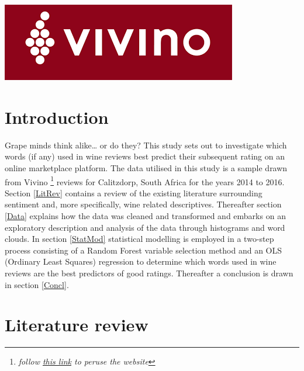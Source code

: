 \documentclass[11pt,preprint]{elsarticle}
\numberwithin{equation}{section}
\numberwithin{figure}{section}
\numberwithin{table}{section}
\let\rmarkdownfootnote\footnote%
\def\footnote{\protect\rmarkdownfootnote}
\begin{document}

\headsep 35pt %




\newpage

\begin{center}\includegraphics[width=0.8\linewidth]{writeup/vivino} \end{center}

\section{Introduction}\label{introduction}

\label{Intro}

Grape minds think alike\ldots{} or do they? This study sets out to
investigate which words (if any) used in wine reviews best predict their
subsequent rating on an online marketplace platform. The data utilised
in this study is a sample drawn from Vivino \footnote{\emph{follow
  \href{https://www.vivino.com/}{this link} to peruse the website}}
reviews for Calitzdorp, South Africa for the years 2014 to 2016. Section
\ref{LitRev} contains a review of the existing literature surrounding
sentiment and, more specifically, wine related descriptives. Thereafter
section \ref{Data} explains how the data was cleaned and transformed and
embarks on an exploratory description and analysis of the data through
histograms and word clouds. In section \ref{StatMod} statistical
modelling is employed in a two-step process consisting of a Random
Forest variable selection method and an OLS (Ordinary Least Squares)
regression to determine which words used in wine reviews are the best
predictors of good ratings. Thereafter a conclusion is drawn in section
\ref{Concl}.

\newpage

\section{Literature review}\label{literature-review}
\end{document}
